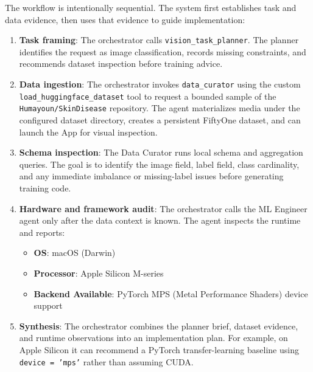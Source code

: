 \documentclass[11pt,a4paper]{article}
\begin{document}
The workflow is intentionally sequential. The system first establishes task and data evidence, then uses that evidence to guide implementation:
\begin{enumerate}
    \item \textbf{Task framing}: The orchestrator calls \texttt{vision\_task\_planner}. The planner identifies the request as image classification, records missing constraints, and recommends dataset inspection before training advice.
    \item \textbf{Data ingestion}: The orchestrator invokes \texttt{data\_curator} using the custom \texttt{load\_huggingface\_dataset} tool to request a bounded sample of the \texttt{Humayoun/SkinDisease} repository. The agent materializes media under the configured dataset directory, creates a persistent FiftyOne dataset, and can launch the App for visual inspection.
    \item \textbf{Schema inspection}: The Data Curator runs local schema and aggregation queries. The goal is to identify the image field, label field, class cardinality, and any immediate imbalance or missing-label issues before generating training code.
    \item \textbf{Hardware and framework audit}: The orchestrator calls the ML Engineer agent only after the data context is known. The agent inspects the runtime and reports:
    \begin{itemize}
        \item \textbf{OS}: macOS (Darwin)
        \item \textbf{Processor}: Apple Silicon M-series
        \item \textbf{Backend Available}: PyTorch MPS (Metal Performance Shaders) device support
    \end{itemize}
    \item \textbf{Synthesis}: The orchestrator combines the planner brief, dataset evidence, and runtime observations into an implementation plan. For example, on Apple Silicon it can recommend a PyTorch transfer-learning baseline using \texttt{device = 'mps'} rather than assuming CUDA.
\end{enumerate}
\end{document}
